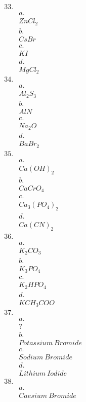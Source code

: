 \documentclass{book}
\begin{document}
\begin{align*}
    33.\\& a. \\&  ZnCl_2 \\& b. \\& CsBr \\& c. \\& KI \\& d. \\& MgCl_2 \\
    34. \\& a. \\& Al_2S_3 \\& b. \\& AlN \\& c. \\& Na_2O \\& d. \\& BaBr_2 \\
    35. \\& a. \\& Ca(OH)_2 \\& b. \\& CaCrO_4 \\& c. \\& Ca_3(PO_4)_2 \\& d. \\& Ca(CN)_2 \\
    36. \\& a. \\& K_2CO_3 \\& b. \\& K_3PO_4 \\& c. \\& K_2HPO_4 \\& d. \\& KCH_3COO \\
    37. \\& a. \\& ? \\& b. \\& Potassium\ Bromide \\& c. \\& Sodium\ Bromide \\& d. \\& Lithium\ Iodide\\
    38. \\& a. \\& Caesium\ Bromide \\&  \\
\end{align*}
\end{document}
